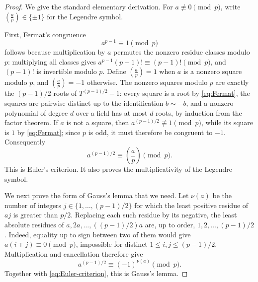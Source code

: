 \documentclass[11pt,a4paper]{amsart}
\theoremstyle{definition}
\newcommand{\leg}[2]{\left(\frac{#1}{#2}\right)}
\numberwithin{equation}{section}
\begin{document}
\begin{proof}
We give the standard elementary derivation.  For \(a\not\equiv0\pmod p\), write
\(\leg ap\in\{\pm1\}\) for the Legendre symbol.

First, Fermat's congruence
\begin{equation}
 a^{p-1}\equiv1\pmod p
 \label{eq:Fermat}
\end{equation}
follows because multiplication by \(a\) permutes the nonzero residue classes modulo
\(p\): multiplying all classes gives
\(a^{p-1}(p-1)!\equiv(p-1)!\pmod p\), and \((p-1)!\) is invertible modulo \(p\).
Define \(\leg ap=1\) when \(a\) is a nonzero square modulo \(p\), and
\(\leg ap=-1\) otherwise.  The nonzero squares modulo \(p\) are exactly the
\((p-1)/2\) roots of \(T^{(p-1)/2}-1\): every square is a root by
\eqref{eq:Fermat}, the squares are pairwise distinct up to the identification
\(b\sim-b\), and a nonzero polynomial of degree \(d\) over a field has at most
\(d\) roots, by induction from the factor theorem.  If \(a\) is not a square,
then \(a^{(p-1)/2}\not\equiv1\pmod p\), while its square is \(1\) by
\eqref{eq:Fermat}; since \(p\) is odd, it must therefore be congruent to \(-1\).
Consequently
\begin{equation}
 a^{(p-1)/2}\equiv\leg ap\pmod p.
 \label{eq:Euler-criterion}
\end{equation}
This is Euler's criterion.  It also proves the multiplicativity of the Legendre
symbol.

We next prove the form of Gauss's lemma that we need.  Let \(\nu(a)\) be the number
of integers \(j\in\{1,\ldots,(p-1)/2\}\) for which the least positive residue of
\(aj\) is greater than \(p/2\).  Replacing each such residue by its negative, the
least absolute residues of
\(a,2a,\ldots,((p-1)/2)a\) are, up to order,
\(1,2,\ldots,(p-1)/2\).  Indeed, equality up to sign between two of them would give
\(a(i\mp j)\equiv0\pmod p\), impossible for distinct
\(1\leq i,j\leq(p-1)/2\).  Multiplication and cancellation therefore give
\begin{equation}
 a^{(p-1)/2}\equiv(-1)^{\nu(a)}\pmod p.
 \label{eq:Gauss-lemma}
\end{equation}
Together with \eqref{eq:Euler-criterion}, this is Gauss's lemma.


\end{proof}
\end{document}
